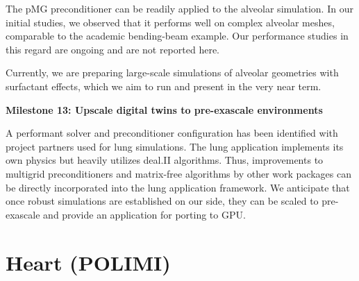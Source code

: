 \documentclass[a4paper,12pt]{article}
\begin{document}
\begin{table}[htbp]
	\centering
	\caption{Comparison of solver performance.}
	\renewcommand{\arraystretch}{1.8}
\label{tab:solver_comparison}
\end{table}

The pMG preconditioner can be readily applied to the alveolar simulation. In our initial studies, we observed that it performs well on complex alveolar meshes, comparable to the academic bending-beam example. Our performance studies in this regard are ongoing and are not reported here.

Currently, we are preparing large-scale simulations of alveolar geometries with surfactant effects, which we aim to run and present in the very near term.


\noindent\textbf{Milestone 13: Upscale digital twins to pre-exascale environments}

A performant solver and preconditioner configuration has been identified with project partners used for lung simulations. The lung application implements its own physics but heavily utilizes deal.II algorithms. Thus, improvements to multigrid preconditioners and matrix-free algorithms by other work packages can be directly incorporated into the lung application framework. We anticipate that once robust simulations are established on our side, they can be scaled to pre-exascale and provide an application for porting to GPU.


\section{Heart (POLIMI)}\label{sec:polimi}
\end{document}

